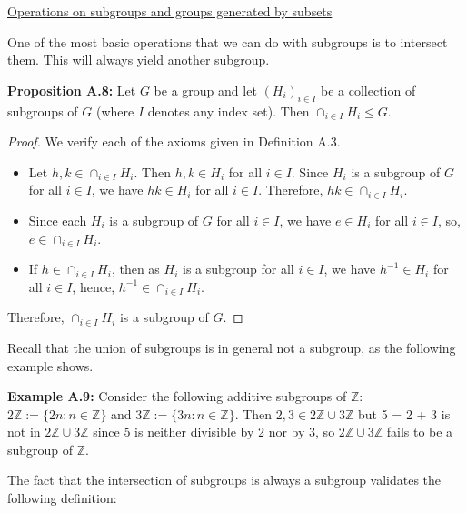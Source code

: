 \documentclass[12pt]{article}
\newcommand{\vs}{\vskip10pt}
\begin{document}
	\vs
	
	\underline{Operations on subgroups and groups generated by subsets}
	
	\vs 
	
	One of the most basic operations that we can do with subgroups is to intersect them. This will always yield another subgroup. 
	
	\vs 
	
	\textbf{Proposition A.8:} Let $G$ be a group and let $(H_i)_{i \in I}$ be a collection of subgroups of $G$ (where $I$ denotes any index set). Then $\cap_{i \in I} H_i \leq G$. 
	
	\vs 
	
	\begin{proof}
		We verify each of the axioms given in Definition A.3. 
		
		\begin{itemize}
			\item Let $h,k \in \cap_{i \in I} H_i$. Then $h,k \in H_i$ for all $i \in I$. Since $H_i$ is a subgroup of $G$ for all $i \in I$, we have $hk \in H_i$ for all $i \in I$. Therefore, $hk \in \cap_{i \in I} H_i$. 
			\item Since each $H_i$ is a subgroup of $G$ for all $i \in I$, we have $e \in H_i$ for all $i \in I$, so, $e \in \cap_{i \in I} H_i$. 
			\item If $h \in \cap_{i \in I} H_i$, then as $H_i$ is a subgroup for all $i \in I$, we have $h^{-1} \in H_i$ for all $i \in I$, hence, $h^{-1} \in \cap_{i \in I} H_i$. 
		\end{itemize}
		
		Therefore, $\cap_{i \in I} H_i$ is a subgroup of $G$.
		
	\end{proof}
	
	Recall that the union of subgroups is in general not a subgroup, as the following example shows. 
	
	\vs
	
	\textbf{Example A.9: } Consider the following additive subgroups of $\mathbb{Z}$: $2 \mathbb{Z} := \{2n: n \in \mathbb{Z}\}$ and $3 \mathbb{Z} := \{3n: n \in \mathbb{Z}\}$. Then $2,3 \in 2\mathbb{Z} \cup 3\mathbb{Z}$ but 5 = 2 + 3 is not in $2 \mathbb{Z} \cup 3 \mathbb{Z}$ since 5 is neither divisible by 2 nor by 3, so $2 \mathbb{Z} \cup 3 \mathbb{Z}$ fails to be a subgroup of $\mathbb{Z}$. 
	
	\vs 
	
	The fact that the intersection of subgroups is always a subgroup validates the following definition: 
	
\end{document}
